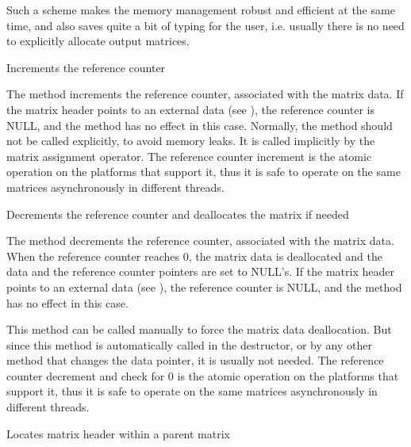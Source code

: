 Such a scheme makes the memory management robust and efficient at the same time, and also saves quite a bit of typing for the user, i.e. usually there is no need to explicitly allocate output matrices.

Increments the reference counter


The method increments the reference counter, associated with the matrix data. If the matrix header points to an external data (see ), the reference counter is NULL, and the method has no effect in this case. Normally, the method should not be called explicitly, to avoid memory leaks. It is called implicitly by the matrix assignment operator. The reference counter increment is the atomic operation on the platforms that support it, thus it is safe to operate on the same matrices asynchronously in different threads.


Decrements the reference counter and deallocates the matrix if needed


The method decrements the reference counter, associated with the matrix data. When the reference counter reaches 0, the matrix data is deallocated and the data and the reference counter pointers are set to NULL's. If the matrix header points to an external data (see ), the reference counter is NULL, and the method has no effect in this case. 

This method can be called manually to force the matrix data deallocation. But since this method is automatically called in the destructor, or by any other method that changes the data pointer, it is usually not needed. The reference counter decrement and check for 0 is the atomic operation on the platforms that support it, thus it is safe to operate on the same matrices asynchronously in different threads.

Locates matrix header within a parent matrix

\begin{description}
\end{description}

